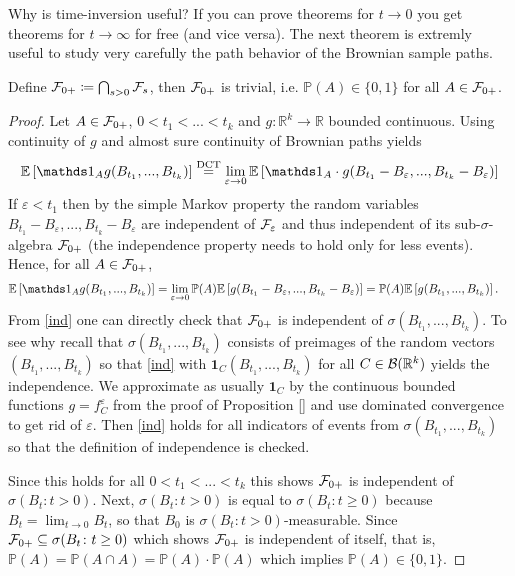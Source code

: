 Why is time-inversion useful? If you can prove theorems for $t\to 0$ you get theorems for $t\to\infty$ for free (and vice versa). The next theorem is extremly useful to study very carefully the path behavior of the Brownian sample paths.
\begin{lsatz}
\begin{theorem}
	Define $\mathcal{F}_{0+} \coloneqq \bigcap_{s>0}\mathcal{F}_s$, then $\mathcal{F}_{0+}$ is trivial, i.e. $\mathbb{P}(A)\in\{0,1\}$ for all $A\in \mathcal{F}_{0+}$.
\end{theorem}
\end{lsatz}
\begin{proof}[Proof]
	Let $A\in \mathcal{F}_{0+}$, $0 < t_1 < ... <t_k$ and $g\colon \mathbb{R}^k \to \mathbb{R}$ bounded continuous. Using continuity of $g$ and almost sure continuity of Brownian paths yields
	\begin{align*}
		\E \left[ \mathds 1_A g(B_{t_1},...,B_{t_k}) \right] \overset{\text{DCT}}{=} \lim_{\varepsilon \to 0} \E \left[ \mathds 1_A \cdot g(B_{t_1}-B_{\varepsilon},...,B_{t_k}-B_{\varepsilon})\right]
	\end{align*}
	If $\varepsilon < t_1$ then by the simple Markov property the random variables $B_{t_1}-B_{\varepsilon},...,B_{t_k}-B_{\varepsilon}$ are independent of $\mathcal{F}_{\varepsilon}$ and thus independent of its sub-$\sigma$-algebra $\mathcal{F}_{0+}$ (the independence property needs to hold only for less events). Hence, for all $A\in \mathcal{F}_{0+}$,
	\begin{align}\label{ind}
		\E \left[ \mathds 1_A g(B_{t_1},...,B_{t_k})\right] &= \lim_{\varepsilon \to 0} \mathbb{P}(A) \E \left[ g(B_{t_1}-B_{\varepsilon},...,B_{t_k}-B_{\varepsilon})\right]
			= \mathbb{P}(A) \E \left[ g(B_{t_1},...,B_{t_k})\right].
	\end{align}
	From \eqref{ind} one can directly check that $\mathcal{F}_{0+}$ is independent of $\sigma(B_{t_1},...,B_{t_k})$. To see why recall that $\sigma(B_{t_1},...,B_{t_k})$ consists of preimages of the random vectors $(B_{t_1},..., B_{t_k})$ so that \eqref{ind} with $\mathbf 1_{C}(B_{t_1},...,B_{t_k})$ for all $C\in \mathcal B(\mathbb{R}^k)$ yields the independence. We approximate as usually $\mathbf 1_{C}$ by the continuous bounded functions $g=f_C^\varepsilon$ from the proof of Proposition \ref{} and use dominated convergence to get rid of $\varepsilon$. Then \eqref{ind} holds for all indicators of events from $\sigma(B_{t_1},...,B_{t_k})$ so that the definition of independence is checked.\smallskip
	
	
	Since this holds for all $0 < t_1 < ... < t_k$ this shows $\mathcal{F}_{0+}$ is independent of $\sigma(B_t \colon t> 0)$. Next, $\sigma(B_t \colon t > 0)$ is equal to $\sigma(B_t \colon t\geq 0)$ because $B_t = \lim_{t\to 0} B_t$, so that $B_0$ is $\sigma(B_t\colon t >0)$-measurable. Since $\mathcal{F}_{0+}\subseteq \sigma(B_t \colon t\geq 0)$ which shows $\mathcal{F}_{0+}$ is independent of itself, that is, $\mathbb{P}(A)= \mathbb{P}(A\cap A) = \mathbb{P}(A)\cdot \mathbb{P}(A)$ which implies $\mathbb{P}(A)\in \{0,1\}$.
\end{proof}
